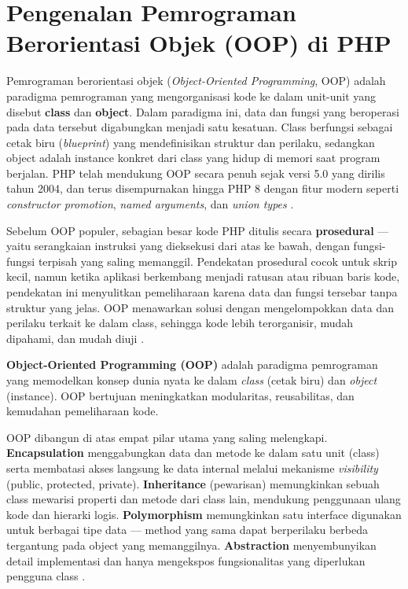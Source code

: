 \section{Pengenalan Pemrograman Berorientasi Objek (OOP) di PHP}

Pemrograman berorientasi objek (\textit{Object-Oriented Programming}, OOP) adalah paradigma pemrograman yang mengorganisasi kode ke dalam unit-unit yang disebut \textbf{class} dan \textbf{object}. Dalam paradigma ini, data dan fungsi yang beroperasi pada data tersebut digabungkan menjadi satu kesatuan. Class berfungsi sebagai cetak biru (\textit{blueprint}) yang mendefinisikan struktur dan perilaku, sedangkan object adalah instance konkret dari class yang hidup di memori saat program berjalan. PHP telah mendukung OOP secara penuh sejak versi 5.0 yang dirilis tahun 2004, dan terus disempurnakan hingga PHP 8 dengan fitur modern seperti \textit{constructor promotion}, \textit{named arguments}, dan \textit{union types} \cite{phpManual}.

Sebelum OOP populer, sebagian besar kode PHP ditulis secara \textbf{prosedural} --- yaitu serangkaian instruksi yang dieksekusi dari atas ke bawah, dengan fungsi-fungsi terpisah yang saling memanggil. Pendekatan prosedural cocok untuk skrip kecil, namun ketika aplikasi berkembang menjadi ratusan atau ribuan baris kode, pendekatan ini menyulitkan pemeliharaan karena data dan fungsi tersebar tanpa struktur yang jelas. OOP menawarkan solusi dengan mengelompokkan data dan perilaku terkait ke dalam class, sehingga kode lebih terorganisir, mudah dipahami, dan mudah diuji \cite{phpRightWay}.

\begin{konsep}
\textbf{Object-Oriented Programming (OOP)} adalah paradigma pemrograman yang memodelkan konsep dunia nyata ke dalam \textit{class} (cetak biru) dan \textit{object} (instance). OOP bertujuan meningkatkan modularitas, reusabilitas, dan kemudahan pemeliharaan kode.
\end{konsep}

OOP dibangun di atas empat pilar utama yang saling melengkapi. \textbf{Encapsulation} menggabungkan data dan metode ke dalam satu unit (class) serta membatasi akses langsung ke data internal melalui mekanisme \textit{visibility} (public, protected, private). \textbf{Inheritance} (pewarisan) memungkinkan sebuah class mewarisi properti dan metode dari class lain, mendukung penggunaan ulang kode dan hierarki logis. \textbf{Polymorphism} memungkinkan satu interface digunakan untuk berbagai tipe data --- method yang sama dapat berperilaku berbeda tergantung pada object yang memanggilnya. \textbf{Abstraction} menyembunyikan detail implementasi dan hanya mengekspos fungsionalitas yang diperlukan pengguna class \cite{phpManual}.

